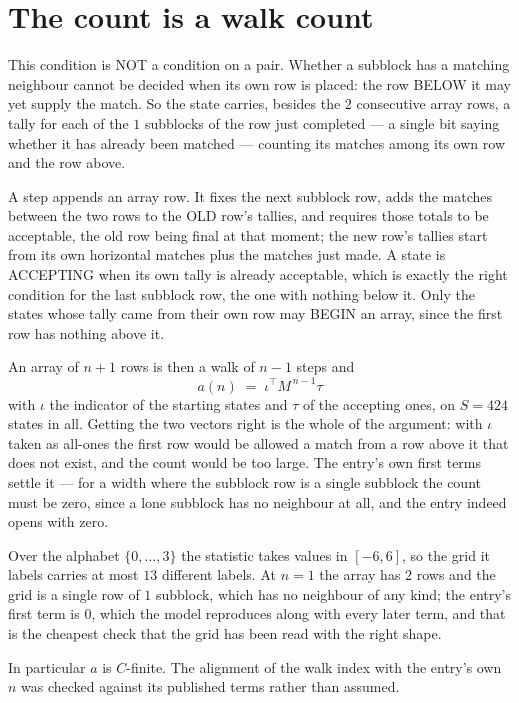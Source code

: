 \documentclass[11pt,a4paper]{article}
\theoremstyle{plain}
\theoremstyle{definition}
\begin{document}
\section{The count is a walk count}

This condition is NOT a condition on a pair. Whether a subblock has a
matching neighbour cannot be decided when its own row is placed: the row BELOW it may yet
supply the match. So the state carries, besides the $2$ consecutive array rows, a tally for
each of the $1$ subblocks of the row just completed --- a single bit saying whether it has already been matched --- counting its matches
among its own row and the row above.

A step appends an array row. It fixes the next subblock row, adds the matches between the two
rows to the OLD row's tallies, and requires those totals to be acceptable, the old row being
final at that moment; the new row's tallies start from its own horizontal matches plus the
matches just made. A state is ACCEPTING when its own tally is already acceptable, which is
exactly the right condition for the last subblock row, the one with nothing below it. Only the
states whose tally came from their own row may BEGIN an array, since the first row has nothing
above it.

An array of $n+1$ rows is then a walk of $n-1$ steps and
\[
a(n)\;=\;\iota^{\!\top}M^{\,n-1}\tau
\]
with $\iota$ the indicator of the starting states and $\tau$ of the accepting ones, on
$S=424$ states in all. Getting the two vectors right is the whole of the argument: with
$\iota$ taken as all-ones the first row would be allowed a match from a row above it that does
not exist, and the count would be too large. The entry's own first terms settle it --- for
a width where the subblock row is a single subblock
the count must be zero, since a lone subblock has no neighbour at all, and the entry indeed opens with zero.

Over the alphabet $\{0,\dots,3\}$ the statistic takes values in $[-6,6]$, so the
grid it labels carries at most $13$ different labels. At $n=1$ the array has $2$
rows and the grid is a single row of $1$
subblock, which has no neighbour of any kind; the entry's first term is
$0$, which the model reproduces along with every later term, and that is the cheapest
check that the grid has been read with the right shape.

In particular $a$ is $C$-finite. The alignment of the walk index with the entry's own $n$ was
checked against its published terms rather than assumed.
\end{document}
